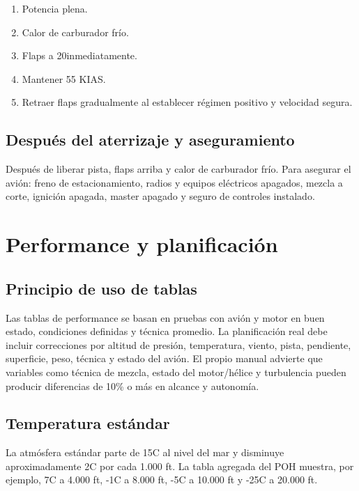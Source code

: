 \documentclass[11pt,oneside]{book}
\newenvironment{checklist}{\begin{enumerate}[label=\arabic*.]}{\end{enumerate}}
\begin{document}
\begin{checklist}
\item Potencia plena.
\item Calor de carburador frío.
\item Flaps a 20\textdegree inmediatamente.
\item Mantener 55 KIAS.
\item Retraer flaps gradualmente al establecer régimen positivo y velocidad segura.
\end{checklist}

\section{Después del aterrizaje y aseguramiento}

Después de liberar pista, flaps arriba y calor de carburador frío. Para asegurar el avión: freno de estacionamiento, radios y equipos eléctricos apagados, mezcla a corte, ignición apagada, master apagado y seguro de controles instalado.

\chapter{Performance y planificación}

\section{Principio de uso de tablas}

Las tablas de performance se basan en pruebas con avión y motor en buen estado, condiciones definidas y técnica promedio. La planificación real debe incluir correcciones por altitud de presión, temperatura, viento, pista, pendiente, superficie, peso, técnica y estado del avión. El propio manual advierte que variables como técnica de mezcla, estado del motor/hélice y turbulencia pueden producir diferencias de 10\% o más en alcance y autonomía.

\section{Temperatura estándar}

La atmósfera estándar parte de 15\textdegree C al nivel del mar y disminuye aproximadamente 2\textdegree C por cada 1.000 ft. La tabla agregada del POH muestra, por ejemplo, 7\textdegree C a 4.000 ft, -1\textdegree C a 8.000 ft, -5\textdegree C a 10.000 ft y -25\textdegree C a 20.000 ft.
\end{document}
